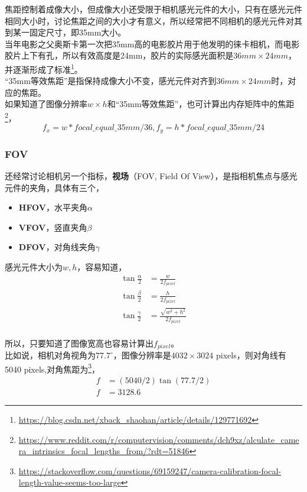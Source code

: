 	焦距控制着成像大小，但成像大小还受限于相机感光元件的大小，只有在感光元件相同大小时，讨论焦距之间的大小才有意义，所以经常把不同相机的感光元件对其到某一固定尺寸，即35mm大小。\\

	当年电影之父奥斯卡第一次把35mm高的电影胶片用于他发明的徕卡相机，而电影胶片上下有孔，所以有效高度是24mm，胶片的实际感光面积是$36mm \times 24mm$，并逐渐形成了标准\footnote{\url{https://blog.csdn.net/xback_shaohan/article/details/129771692}}。\\

	“35mm等效焦距”是指保持成像大小不变，感光元件对齐到$36mm \times 24mm$时，对应的焦距。\\

	如果知道了图像分辨率$w \times h$和“35mm等效焦距”，也可计算出内存矩阵中的焦距\footnote{\url{https://www.reddit.com/r/computervision/comments/dch9xz/alculate_camera_intrinsics_focal_lengths_from/?rdt=51846}}，
	$$
		f_x = w * focal\_equal\_35mm/36, f_y = h * focal\_equal\_35mm/24
	$$

\subsubsection*{FOV}
	还经常讨论相机另一个指标，\textbf{视场}（FOV, Field Of View），是指相机焦点与感光元件的夹角，具体有三个，
	\begin{itemize}
		\item \textbf{HFOV}，水平夹角$\alpha$
		\item \textbf{VFOV}，竖直夹角$\beta$
		\item \textbf{DFOV}，对角线夹角$\gamma$
	\end{itemize}

	感光元件大小为$w,h$，容易知道，
	\begin{align*}
		\tan\frac{\alpha}{2} &= \frac{w}{2f_{pixel}}\\
		\tan\frac{\beta}{2} &= \frac{h}{2f_{pixel}}\\
		\tan\frac{\gamma}{2} &= \frac{\sqrt{w^2 + h^2}}{2f_{pixel}}\\
	\end{align*}

	所以，只要知道了图像宽高也容易计算出$f_{pixel}$。\\

	比如说，相机对角视角为$77.7^\circ$，图像分辨率是$4032 \times 3024$ pixels，则对角线有5040 pixels,对角焦距为\footnote{\url{https://stackoverflow.com/questions/69159247/camera-calibration-focal-length-value-seems-too-large}}，
	\begin{align*}
		f &= (5040/2)\tan(77.7/2)\\
		f &= 3128.6
	\end{align*}

